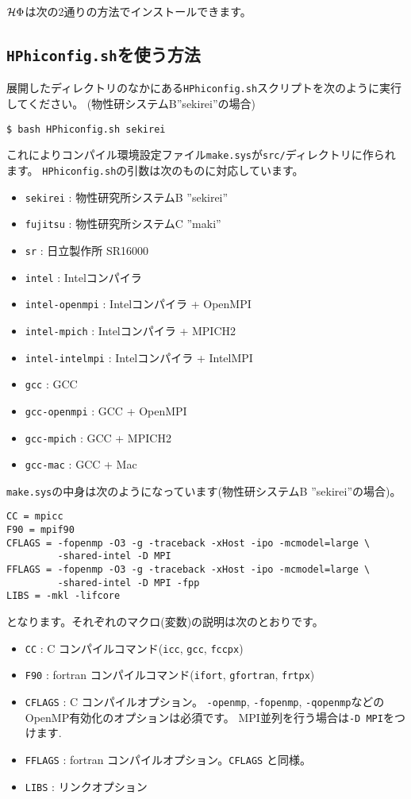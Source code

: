 $\mathcal{H} \Phi$は次の2通りの方法でインストールできます。

\subsection{\texttt{HPhiconfig.sh}を使う方法}

展開したディレクトリのなかにある\verb|HPhiconfig.sh|スクリプトを次のように実行してください。
(物性研システムB''sekirei''の場合)
\begin{verbatim}
$ bash HPhiconfig.sh sekirei
\end{verbatim}
これによりコンパイル環境設定ファイル\verb|make.sys|が\verb|src/|ディレクトリに作られます。
\verb|HPhiconfig.sh|の引数は次のものに対応しています。
\begin{itemize}
\item \verb|sekirei| : 物性研究所システムB ''sekirei''
\item \verb|fujitsu| : 物性研究所システムC ''maki''
\item \verb|sr| : 日立製作所 SR16000
\item \verb|intel| : Intelコンパイラ
\item \verb|intel-openmpi| : Intelコンパイラ + OpenMPI
\item \verb|intel-mpich| : Intelコンパイラ + MPICH2
\item \verb|intel-intelmpi| : Intelコンパイラ + IntelMPI
\item \verb|gcc| : GCC
\item \verb|gcc-openmpi| : GCC + OpenMPI
\item \verb|gcc-mpich| : GCC + MPICH2
\item \verb|gcc-mac| : GCC + Mac
\end{itemize}

\verb|make.sys|の中身は次のようになっています(物性研システムB ''sekirei''の場合)。
\begin{verbatim}
CC = mpicc
F90 = mpif90
CFLAGS = -fopenmp -O3 -g -traceback -xHost -ipo -mcmodel=large \
         -shared-intel -D MPI
FFLAGS = -fopenmp -O3 -g -traceback -xHost -ipo -mcmodel=large \
         -shared-intel -D MPI -fpp
LIBS = -mkl -lifcore
\end{verbatim}
となります。それぞれのマクロ(変数)の説明は次のとおりです。
\begin{itemize}
\item \verb|CC| : C コンパイルコマンド(\verb|icc|, \verb|gcc|, \verb|fccpx|)
\item \verb|F90| : fortran コンパイルコマンド(\verb|ifort|, \verb|gfortran|, \verb|frtpx|)
\item \verb|CFLAGS| : C コンパイルオプション。
  \verb|-openmp|, \verb|-fopenmp|, \verb|-qopenmp|などのOpenMP有効化のオプションは必須です。
  MPI並列を行う場合は\verb|-D MPI|をつけます. 
\item \verb|FFLAGS| : fortran コンパイルオプション。\verb|CFLAGS| と同様。
\item \verb|LIBS| : リンクオプション
\end{itemize}

